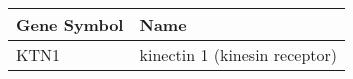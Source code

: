 \begin{tabular}{ll}
\toprule
Gene Symbol &                          Name \\
\midrule
       KTN1 & kinectin 1 (kinesin receptor) \\
\bottomrule
\end{tabular}
